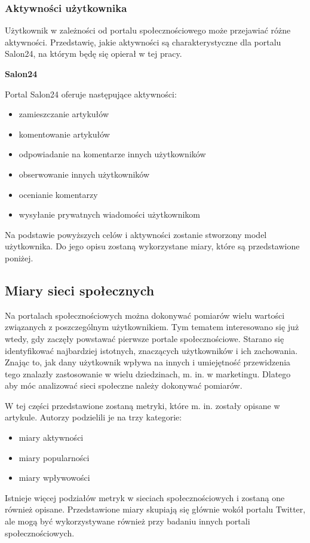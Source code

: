 \documentclass[polish,12pt]{aghthesis}
\begin{document}
\subsubsection{Aktywności użytkownika}
Użytkownik w zależności od portalu społecznościowego może przejawiać różne aktywności. Przedstawię, jakie aktywności są charakterystyczne dla portalu Salon24, na którym będę się opierał w tej pracy.
\vspace{5mm}

\noindent
\textbf{Salon24}

Portal Salon24\cite{salon24} oferuje następujące aktywności:
\begin{itemize}
    \item zamieszczanie artykułów
    \item komentowanie artykułów
    \item odpowiadanie na komentarze innych użytkowników
    \item obserwowanie innych użytkowników
    \item ocenianie komentarzy
    \item wysyłanie prywatnych wiadomości użytkownikom
\end{itemize}

Na podstawie powyższych celów i aktywności zostanie stworzony model użytkownika. Do jego opisu zostaną wykorzystane miary, które są przedstawione poniżej.


\subsection{Miary sieci społecznych}
Na portalach społecznościowych można dokonywać pomiarów wielu wartości związanych z poszczególnym użytkownikiem. Tym tematem interesowano się już wtedy, gdy zaczęły powstawać pierwsze portale społecznościowe. Starano się identyfikować najbardziej istotnych, znaczących użytkowników i ich zachowania. Znając to, jak dany użytkownik wpływa na innych i umiejętność przewidzenia tego znalazły zastosowanie w wielu dziedzinach, m. in. w marketingu. Dlatego aby móc analizować sieci społeczne należy dokonywać pomiarów. 

W tej części przedstawione zostaną metryki, które m. in. zostały opisane w artykule\cite{measure}. Autorzy podzielili je na trzy kategorie:
\begin{itemize}
    \item miary aktywności
    \item miary popularności
    \item miary wpływowości
\end{itemize}
Istnieje więcej podziałów metryk w sieciach społecznościowych i zostaną one również opisane. Przedstawione miary skupiają się głównie wokół portalu Twitter, ale mogą być wykorzystywane również przy badaniu innych portali społecznościowych.
\end{document}
